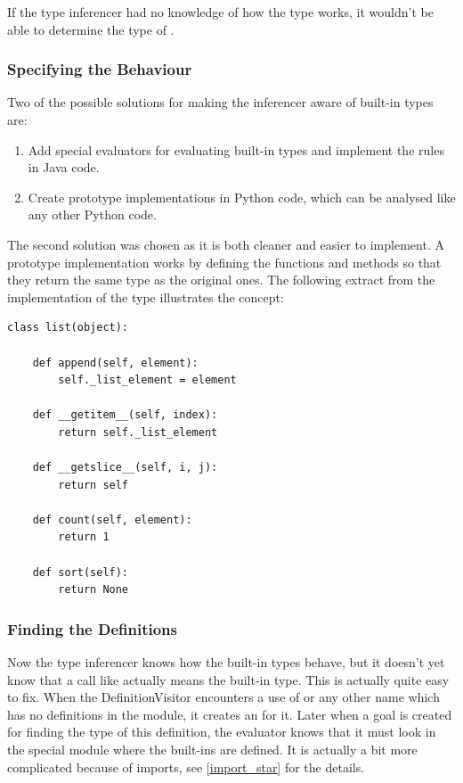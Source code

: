 \documentclass[12pt,halfparskip]{scrreprt}
\begin{document}
If the type inferencer had no knowledge of how the  type works, it wouldn't be able to determine the type of .

\subsubsection{Specifying the Behaviour}

Two of the possible solutions for making the inferencer aware of built-in types are:

\begin{enumerate}
	\item Add special evaluators for evaluating built-in types and implement the rules in Java code.
	\item Create prototype implementations in Python code, which can be analysed like any other Python code.
\end{enumerate}

The second solution was chosen as it is both cleaner and easier to implement. A prototype implementation works by defining the functions and methods so that they return the same type as the original ones. The following extract from the implementation of the  type illustrates the concept:

\begin{lstlisting}
class list(object):

    def append(self, element):
        self._list_element = element

    def __getitem__(self, index):
        return self._list_element

    def __getslice__(self, i, j):
        return self

    def count(self, element):
        return 1

    def sort(self):
        return None
\end{lstlisting}

\subsubsection{Finding the Definitions}

Now the type inferencer knows how the built-in types behave, but it doesn't yet know that a call like  actually means the built-in type. This is actually quite easy to fix. When the DefinitionVisitor encounters a use of  or any other name which has no definitions in the module, it creates an  for it. Later when a goal is created for finding the type of this definition, the evaluator knows that it must look in the special module  where the built-ins are defined. It is actually a bit more complicated because of  imports, see \vref{import_star} for the details.
\end{document}
